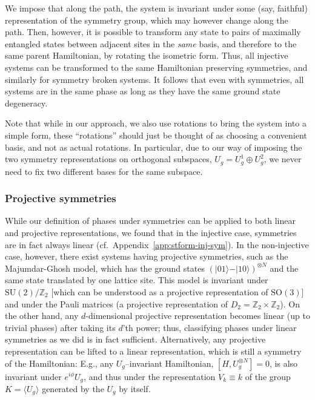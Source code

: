 \documentclass[twocolumn,superscriptaddress,prb,linenumbers]{revtex4-1}
\newcommand{\ket}[1]{\vert#1\rangle}
\begin{document}
We impose that along the path, the system is invariant under some (say,
faithful) representation of the symmetry group, which may however change
along the path. Then, however, it is possible to transform any state to
pairs of maximally entangled states between adjacent sites in the
\emph{same} basis, and therefore to the same parent Hamiltonian, by
rotating the isometric form. Thus, all injective systems can be
transformed to the same Hamiltonian preserving symmetries, and similarly
for symmetry broken systems. It follows that even with symmetries, all
systems are in the same phase as long as they have the same ground state
degeneracy.

Note that while in our approach, we also use rotations to bring the system
into a simple form, these ``rotations'' should just be thought of as
choosing a convenient basis, and not as actual rotations. In
particular, due to our way of imposing the two symmetry representations on
orthogonal subspaces, $U_g=U^1_g\oplus U^2_g$, we never need to fix two
different bases for the same subspace.



\subsubsection{Projective symmetries }

While our definition of phases under symmetries can be applied to both
linear and projective representations, we found that in the injective
case, symmetries are in fact always linear
(cf.~Appendix~\ref{app:stform-inj-sym}).   In the non-injective case,
however, there exist systems having projective symmetries, such as the
Majumdar-Ghosh model, which has the ground states
$(\ket{01}-\ket{10})^{\otimes N}$ and the same state
translated by one lattice site.
This model is invariant under $\mathrm{SU}(2)/\mathbb Z_2$ [which can be
        understood as a projective representation of $\mathrm{SO}(3)$] and under
the Pauli
matrices (a
projective representation of $D_2=\mathbb Z_2\times \mathbb Z_2$).  On the
other hand, any $d$-dimensional projective representation becomes linear
(up to trivial phases) after taking its $d$'th power; thus,
classifying phases under linear symmetries as we did is in fact sufficient.
Alternatively, any projective representation can be lifted to a linear
representation, which is still a symmetry of the Hamiltonian: E.g., any
$U_g$--invariant Hamiltonian, $[H,U_g^{\otimes N}]=0$, is also invariant
under $e^{i\phi}U_g$, and thus under the representation $V_k\equiv k$ of the
group $K=\langle U_g\rangle$ generated by the $U_g$ by itself.
\end{document}

